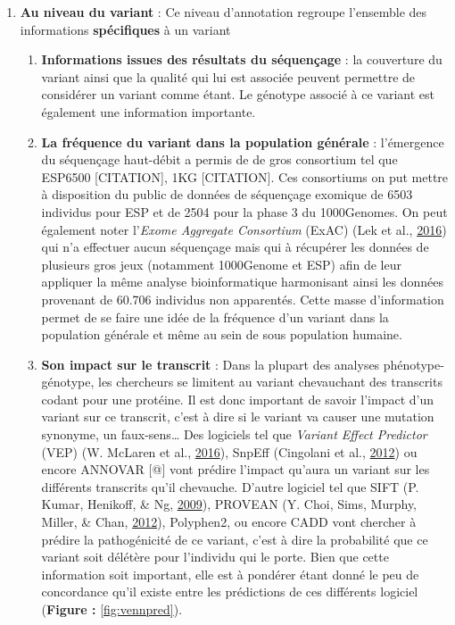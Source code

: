 \documentclass[12pt,twoside]{reedthesis}
\providecommand{\tightlist}{%
  \setlength{\itemsep}{0pt}\setlength{\parskip}{0pt}}
\theoremstyle{definition}
\theoremstyle{definition}
\theoremstyle{remark}
\begin{document}
  \begin{enumerate}
  \def\labelenumi{\arabic{enumi}.}
  \tightlist
  \item
    \textbf{Au niveau du variant} : Ce niveau d'annotation regroupe
    l'ensemble des informations \textbf{spécifiques} à un variant
  
    \begin{enumerate}
    \def\labelenumii{\alph{enumii}.}
    \tightlist
    \item
      \textbf{Informations issues des résultats du séquençage} : la
      couverture du variant ainsi que la qualité qui lui est associée
      peuvent permettre de considérer un variant comme étant. Le génotype
      associé à ce variant est également une information importante.\\
    \item
      \textbf{La fréquence du variant dans la population générale} :
      l'émergence du séquençage haut-débit a permis de de gros consortium
      tel que ESP6500 {[}CITATION{]}, 1KG {[}CITATION{]}. Ces consortiums
      on put mettre à disposition du public de données de séquençage
      exomique de 6503 individus pour ESP et de 2504 pour la phase 3 du
      1000Genomes. On peut également noter l'\emph{Exome Aggregate
      Consortium} (ExAC) (Lek et al.,
      \protect\hyperlink{ref-Lek2016}{2016}) qui n'a effectuer aucun
      séquençage mais qui à récupérer les données de plusieurs gros jeux
      (notamment 1000Genome et ESP) afin de leur appliquer la même analyse
      bioinformatique harmonisant ainsi les données provenant de 60.706
      individus non apparentés. Cette masse d'information permet de se
      faire une idée de la fréquence d'un variant dans la population
      générale et même au sein de sous population humaine.\\
    \item
      \textbf{Son impact sur le transcrit} : Dans la plupart des analyses
      phénotype-génotype, les chercheurs se limitent au variant
      chevauchant des transcrits codant pour une protéine. Il est donc
      important de savoir l'impact d'un variant sur ce transcrit, c'est à
      dire si le variant va causer une mutation synonyme, un
      faux-sens\ldots{} Des logiciels tel que \emph{Variant Effect
      Predictor} (VEP) (W. McLaren et al.,
      \protect\hyperlink{ref-McLaren2016}{2016}), SnpEff (Cingolani et
      al., \protect\hyperlink{ref-Cingolani2012}{2012}) ou encore ANNOVAR
      {[}@{]} vont prédire l'impact qu'aura un variant sur les différents
      transcrits qu'il chevauche. D'autre logiciel tel que SIFT (P. Kumar,
      Henikoff, \& Ng, \protect\hyperlink{ref-Kumar2009}{2009}), PROVEAN
      (Y. Choi, Sims, Murphy, Miller, \& Chan,
      \protect\hyperlink{ref-Choi2012}{2012}), Polyphen2, ou encore CADD
      vont chercher à prédire la pathogénicité de ce variant, c'est à dire
      la probabilité que ce variant soit délétère pour l'individu qui le
      porte. Bien que cette information soit important, elle est à
      pondérer étant donné le peu de concordance qu'il existe entre les
      prédictions de ces différents logiciel (\textbf{Figure :}
      \ref{fig:vennpred}).
    \end{enumerate}
  \end{enumerate}
  
\end{document}
